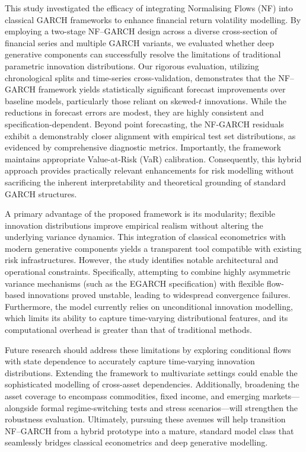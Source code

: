 \documentclass[risks,article,submit,pdftex,moreauthors]{Definitions/mdpi}
\begin{document}
This study investigated the efficacy of integrating Normalising Flows (NF) into classical GARCH frameworks to enhance financial return volatility modelling. By employing a two-stage NF–GARCH design across a diverse cross-section of financial series and multiple GARCH variants, we evaluated whether deep generative components can successfully resolve the limitations of traditional parametric innovation distributions. Our rigorous evaluation, utilizing chronological splits and time-series cross-validation, demonstrates that the NF–GARCH framework yields statistically significant forecast improvements over baseline models, particularly those reliant on skewed-$t$ innovations. While the reductions in forecast errors are modest, they are highly consistent and specification-dependent. Beyond point forecasting, the NF-GARCH residuals exhibit a demonstrably closer alignment with empirical test set distributions, as evidenced by comprehensive diagnostic metrics. Importantly, the framework maintains appropriate Value-at-Risk (VaR) calibration. Consequently, this hybrid approach provides practically relevant enhancements for risk modelling without sacrificing the inherent interpretability and theoretical grounding of standard GARCH structures.

A primary advantage of the proposed framework is its modularity; flexible innovation distributions improve empirical realism without altering the underlying variance dynamics. This integration of classical econometrics with modern generative components yields a transparent tool compatible with existing risk infrastructures. However, the study identifies notable architectural and operational constraints. Specifically, attempting to combine highly asymmetric variance mechanisms (such as the EGARCH specification) with flexible flow-based innovations proved unstable, leading to widespread convergence failures. Furthermore, the model currently relies on unconditional innovation modelling, which limits its ability to capture time-varying distributional features, and its computational overhead is greater than that of traditional methods.

Future research should address these limitations by exploring conditional flows with state dependence to accurately capture time-varying innovation distributions. Extending the framework to multivariate settings could enable the sophisticated modelling of cross-asset dependencies. Additionally, broadening the asset coverage to encompass commodities, fixed income, and emerging markets—alongside formal regime-switching tests and stress scenarios—will strengthen the robustness evaluation. Ultimately, pursuing these avenues will help transition NF–GARCH from a hybrid prototype into a mature, standard model class that seamlessly bridges classical econometrics and deep generative modelling.
\end{document}
